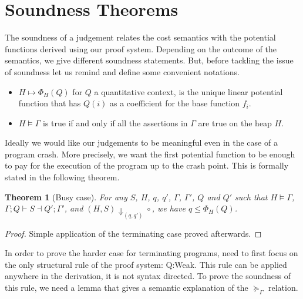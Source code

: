 \documentclass[nocopyrightspace,preprint]{sigplanconf}
\newtheorem{theorem}{Theorem}
\begin{document}
\section{Soundness Theorems}

The soundness of a judgement relates the cost semantics with the potential
functions derived using our proof system.  Depending on the outcome of
the semantics, we give different soundness statements.
But, before tackling the issue of soundness let us remind and define some
convenient notations.
\begin{itemize}
\item $H \mapsto \Phi_H(Q)$ for $Q$ a quantitative context, is the
unique linear potential function that has $Q(i)$ as a coefficient for the
base function $f_i$.
\item $H \models \Gamma$ is true if and only if all the assertions in
$\Gamma$ are true on the heap $H$.
\end{itemize}

Ideally we would
like our judgements to be meaningful even in the case of a program
crash.  More precisely, we want the first potential function to be enough
to pay for the execution of the program up to the crash point.  This is
formally stated in the following theorem.

\begin{theorem}[Busy case]
For any $S$, $H$, $q$, $q'$, $\Gamma$, $\Gamma'$, $Q$ and $Q'$
such that $H \models \Gamma$, $\Gamma; Q \vdash S \dashv Q'; \Gamma'$,
  and $(H, S) \Downarrow_{(q,q')} \circ$,
we have $q \le \Phi_H(Q)$.
\end{theorem}
\begin{proof}
Simple application of the terminating case proved afterwards.
\end{proof}

In order to prove the harder case for terminating programs, need to first
focus on the only structural rule of the proof system: {\sc Q:Weak}.  This
rule can be applied anywhere in the derivation, it is not syntax directed.
To prove the soundness of this rule, we need a lemma that gives a
semantic explanation of the $\succeq_\Gamma$ relation.
\end{document}
